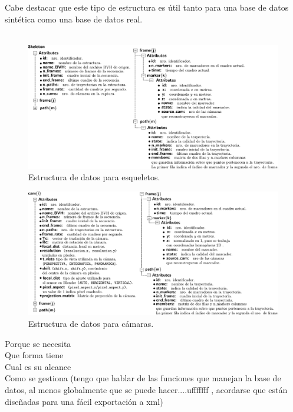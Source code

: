 Cabe destacar que este tipo de estructura es útil tanto para una base de datos sintética como una base de datos real. \\
\\

\begin{figure}[H]
   \centering 
   \includegraphics[scale=0.6]{img/Base_Datos/Estructura_datos_skeleton.pdf}
   \caption{Estructura de datos para esqueletos.}  
   \label{img_estructura_skeleton} 
 \end{figure} 

\begin{figure}[H]
   \centering 
   \includegraphics[scale=0.6]{img/Base_Datos/Estructura_datos_cam.pdf}
   \caption{Estructura de datos para cámaras.}
   \label{img_estructura_cam}    
 \end{figure} 

Porque se necesita\\
Que forma tiene\\
Cual es su alcance\\
Como se gestiona (tengo que hablar de las funciones que manejan la base de datos, al menos globalmente que se puede hacer....ufffffff
, acordarse que están diseñadas para una fácil exportación a xml)\\
\\
